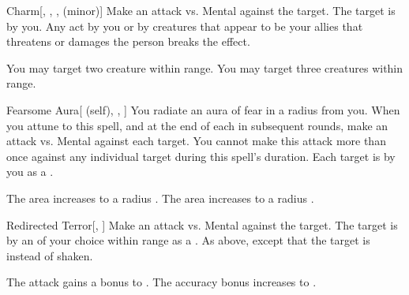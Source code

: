 \lowercase{\hypertarget{spell:Charm}{}}\label{spell:Charm}
\begin{freeability}[Rank 3]{\hypertarget{spell:Charm}{Charm}}[, , ,  (minor)]
Make an attack vs. Mental against the target.
\hit The target is \charmed by you.
Any act by you or by creatures that appear to be your allies that threatens or damages the  person breaks the effect.

\rankline
{} You may target two creature within range.
 You may target three creatures within range.
\end{freeability}
\vspace{0.25em}



\lowercase{\hypertarget{spell:Fearsome Aura}{}}\label{spell:Fearsome Aura}
\begin{attuneability}[Rank 3]{\hypertarget{spell:Fearsome Aura}{Fearsome Aura}}[ (self), , ]
You radiate an aura of fear in a \areamed radius  from you.
When you attune to this spell, and at the end of each  in subsequent rounds, make an attack vs. Mental against each target.
You cannot make this attack more than once against any individual target during this spell's duration.
\hit Each target is  by you as a .

\rankline
{} The area increases to a \arealarge radius .
 The area increases to a \areahuge radius .
\end{attuneability}
\vspace{0.25em}



\lowercase{\hypertarget{spell:Redirected Terror}{}}\label{spell:Redirected Terror}
\begin{freeability}[Rank 3]{\hypertarget{spell:Redirected Terror}{Redirected Terror}}[, ]
Make an attack vs. Mental against the target.
\hit The target is \shaken by an  of your choice within range as a .
\crit As above, except that the target is \panicked instead of shaken.

\rankline
{} The attack gains a  bonus to .
 The accuracy bonus increases to .
\end{freeability}
\vspace{0.25em}



